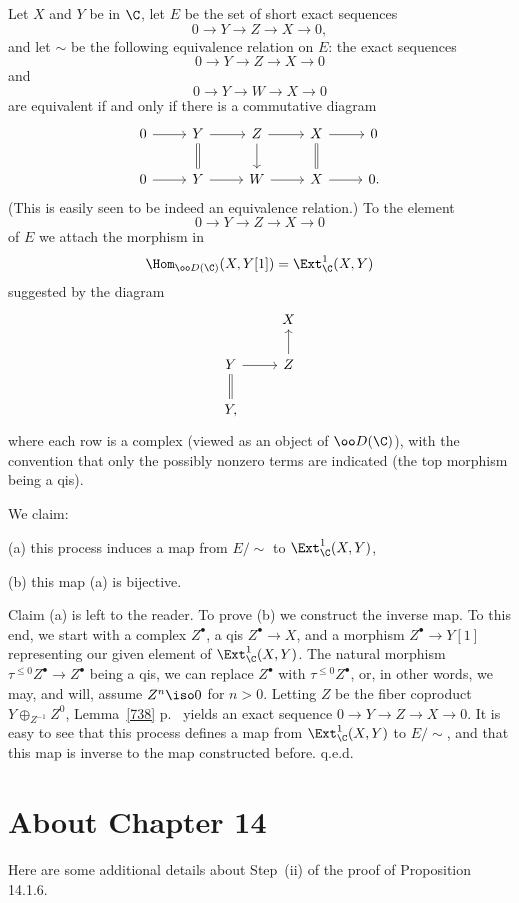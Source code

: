 \documentclass[12pt]{article}
\theoremstyle{remark}
\theoremstyle{definition}
\begin{document}
Let $X$ and $Y$ be in $\C$, let $E$ be the set of short exact sequences 
$$
0\to Y\to Z\to X\to0,
$$ 
and let $\sim$ be the following equivalence relation on $E$: the exact sequences 
$$
0\to Y\to Z\to X\to0
$$ 
and 
$$
0\to Y\to W\to X\to0
$$ 
are equivalent if and only if there is a commutative diagram 
$$
\begin{tikzcd}
0\ar{r}&Y\ar[equal]{d}\ar{r}&Z\ar{d}\ar{r}&X\ar[equal]{d}\ar{r}&0\\ 
0\ar{r}&Y\ar{r}&W\ar{r}&X\ar{r}&0.
\end{tikzcd}
$$ 
(This is easily seen to be indeed an equivalence relation.) To the element 
$$
0\to Y\to Z\to X\to0
$$ 
of $E$ we attach the morphism in 
$$
\Hom_{\oo D(\C)}(X,Y[1])=\Ext^1_\C(X,Y)
$$ 
suggested by the diagram 
$$
\begin{tikzcd}
{}&X\\ 
Y\ar[equal]{d}\ar{r}&Z\ar{u}\\ 
Y,
\end{tikzcd}
$$ 
where each row is a complex (viewed as an object of $\oo D(\C)$), with the convention that only the possibly nonzero terms are indicated (the top morphism being a qis). 

We claim: 

(a) this process induces a map from $E/\!\!\sim$ to $\Ext^1_\C(X,Y)$, 

(b) this map (a) is bijective. 

Claim (a) is left to the reader. To prove (b) we construct the inverse map. To this end, we start with a complex $Z^\bullet$, a qis $Z^\bullet\to X$, and a morphism $Z^\bullet\to Y[1]$ representing our given element of $\Ext^1_\C(X,Y)$. The natural morphism $\tau^{\le0}Z^\bullet\to Z^\bullet$ being a qis, we can replace $Z^\bullet$ with $\tau^{\le0}Z^\bullet$, or, in other words, we may, and will, assume $Z^n\iso0$ for $n>0$. Letting $Z$ be the fiber coproduct $Y\oplus_{Z^{-1}}Z^0$, Lemma~\ref{738} p.~ yields an exact sequence $0\to Y\to Z\to X\to0$. It is easy to see that this process defines a map from $\Ext^1_\C(X,Y)$ to $E/\!\!\sim$, and that this map is inverse to the map constructed before. q.e.d.


\section{About Chapter 14}


Here are some additional details about Step~(ii) of the proof of Proposition 14.1.6. 
\end{document}

